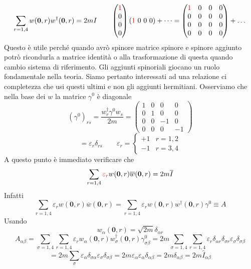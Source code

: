 $$
\sum_{r=1,4} w(\mathbf{0}, r) w^\dagger(\mathbf{0}, r) = 2mI \qquad \begin{pmatrix} \textcolor{red}{1} \\ 0 \\ 0 \\ 0 \end{pmatrix} ( \textcolor{red}{1} \,\, 0 \,\, 0 \,\, 0 ) + \dots = \begin{pmatrix} \textcolor{red}{1} & 0 & 0 & 0 \\ 0 & 0 & 0 & 0 \\ 0 & 0 & 0 & 0 \\ 0 & 0 & 0 & 0 \end{pmatrix} + \dots
$$
Questo è utile perché quando avrò spinore matrice spinore e spinore aggiunto potrò ricondurla a matrice identità o alla trasformazione di questa quando cambio sistema di riferimento.
Gli aggiunti spinoriali giocano un ruolo fondamentale nella teoria. Siamo pertanto interessati ad una relazione ci completezza che usi questi ultimi e non gli aggiunti hermitiani. Osserviamo che nella base dei $w$ la matrice $\gamma^0$ è diagonale
$$
(\gamma^0)_{rs} = \frac{w_r^\dagger \gamma^0 w_s}{2m} = \begin{pmatrix} 1 & 0 & 0 & 0 \\ 0 & 1 & 0 & 0 \\ 0 & 0 & -1 & 0 \\ 0 & 0 & 0 & -1 \end{pmatrix}
$$
$$
= \varepsilon_r \delta_{rs} \qquad \varepsilon_r = \begin{cases} +1 & r=1,2 \\ -1 & r=3,4 \end{cases}
$$
A questo punto è immediato verificare che
$$
\sum_{r=1,4} \textcolor{red}{\varepsilon_r} w(\mathbf{0}, r) \overline{w}(\mathbf{0}, r) = 2m\overline{I}
$$
Infatti
$$
\sum_{r=1,4} \varepsilon_r w(\mathbf{0}, r) \overline{w}(\mathbf{0}, r) = \sum_{r=1,4} \varepsilon_r w(\mathbf{0}, r) w^\dagger(\mathbf{0}, r) \gamma^0 \equiv A
$$
Usando
$$
w_\alpha(\mathbf{0}, r) = \sqrt{2m} \delta_{\alpha r}
$$
$$
A_{\alpha\beta} = \sum_{\sigma=1,4} \sum_{r=1,4} \varepsilon_r w_\alpha(\mathbf{0}, r) w_\sigma^\dagger(\mathbf{0}, r) \gamma^0_{\sigma\beta} = 2m \sum_{\sigma=1,4} \sum_{r=1,4} \varepsilon_r \delta_{\alpha r} \delta_{\sigma r} \varepsilon_\sigma \delta_{\sigma\beta}
$$
$$
= 2m \sum_{\sigma} \varepsilon_\alpha \delta_{\sigma\alpha} \varepsilon_\sigma \delta_{\sigma\beta} = 2m \varepsilon_\alpha \varepsilon_\alpha \delta_{\alpha\beta} = 2m \delta_{\alpha\beta} = 2m\hat{I}_{\alpha\beta}
$$
